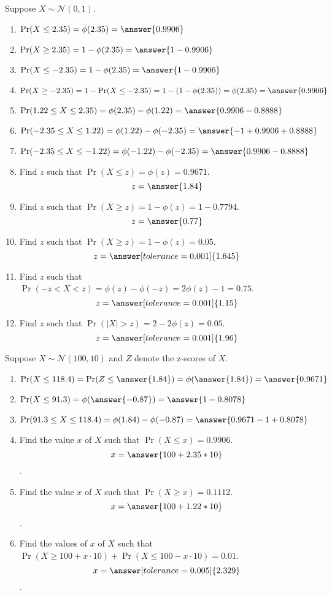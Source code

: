 \documentclass{ximera}
\begin{document}
\begin{problem}
Suppose $X\sim \mathcal N(0,1).$ 
\begin{enumerate}
\item $\Pr(X\leq 2.35)=\phi(2.35)=\answer{0.9906}$
\item $\Pr(X\geq 2.35)=1-\phi(2.35)=\answer{1-0.9906}$
\item $\Pr(X\leq -2.35)=1-\phi(2.35)=\answer{1-0.9906}$
\item $\Pr(X\geq -2.35)=1-\Pr(X\leq -2.35)=1-(1-\phi(2.35))=\phi(2.35)=\answer{0.9906}$
\item $\Pr(1.22\leq X\leq 2.35)=\phi(2.35)-\phi(1.22)=\answer{0.9906-0.8888}$
\item $\Pr(-2.35\leq X\leq 1.22)=\phi(1.22)-\phi(-2.35)=\answer{-1+0.9906+0.8888}$
\item $\Pr(-2.35\leq X\leq -1.22)=\phi(-1.22)-\phi(-2.35)=\answer{0.9906-0.8888}$
\item Find $z$ such that $\Pr(X\leq z)=\phi(z)={0.9671}$.
$$z=\answer{1.84}$$
\item Find $z$ such that $\Pr(X\geq z)=1-\phi(z)={1-0.7794}$.
$$z=\answer{0.77}$$
\item Find $z$ such that $\Pr(X\geq z)=1-\phi(z)={0.05}$.
$$z=\answer[tolerance=0.001]{1.645}$$
\item Find $z$ such that $\Pr(-z<X< z)=\phi(z)-\phi(-z)=2\phi(z)-1={0.75}$.
$$z=\answer[tolerance=0.001]{1.15}$$
\item Find $z$ such that $\Pr(|X|> z)=2-2\phi(z)={0.05}$.
$$z=\answer[tolerance=0.001]{1.96}$$

\end{enumerate}
\end{problem}

\begin{problem}
Suppose $X\sim \mathcal N(100,10)$ and $Z$ denote the z-scores of $X$. 
\begin{enumerate}
\item $\Pr(X\leq 118.4)=\Pr(Z\leq \answer{1.84})=\phi(\answer{1.84})=\answer{0.9671}$
\item $\Pr(X\leq 91.3)=\phi(\answer{-0.87})=\answer{1-0.8078}$
\item $\Pr(91.3\leq X\leq 118.4)=\phi(1.84)-\phi(-0.87)=\answer{0.9671-1+0.8078}$
\item Find the value $x$ of $X$ such that $\Pr(X\leq x)=0.9906$.
$$x=\answer{100+2.35*10}$$.
\item Find the value $x$ of $X$ such that $\Pr(X\geq x)=0.1112$.
$$x=\answer{100+1.22*10}$$.
\item Find the values of $x$ of $X$ such that $\Pr(X\geq 100+x\cdot 10)+\Pr(X\leq 100-x\cdot 10)=0.01$.
$$x=\answer[tolerance=0.005]{2.329}$$.
\end{enumerate}
\end{problem}
\end{document}

